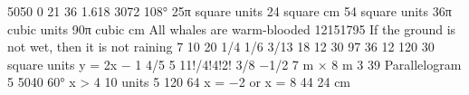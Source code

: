 \answerkey
{} 5050
 0
 21
 36
 1.618
 3072
 108°
 25π square units
 24 square cm
 54 square units
 36π cubic units
 90π cubic cm
 All whales are warm‑blooded
 12151795
 If the ground is not wet, then it is not raining
 7
 10
 20
 1/4
 1/6
 3/13
 18
 12
 30
 97
 36
 12
 120
 30 square units
 y = 2x − 1
 4/5
 5
 11!/4!4!2!
 3/8
 −1/2
 7 m × 8 m
 3
 39
 Parallelogram
 5
 5040
 60°
 x > 4
 10 units
 5
 120
 64
 x = −2 or x = 8
 44%
 24 cm
\endanswerkey